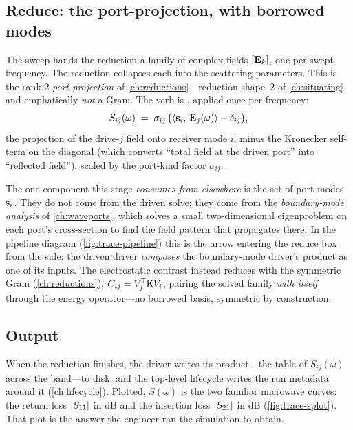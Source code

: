 \subsection{Reduce: the port-projection, with borrowed modes}
\label{sec:trace-reduce}

The sweep hands the reduction a family of complex fields $[\mathbf{E}_k]$, one per swept
frequency. The reduction collapses each into the scattering parameters. This is
the rank-2 \emph{port-projection} of \cref{ch:reductions}---reduction shape~2 of
\cref{ch:situating}, and emphatically \emph{not} a Gram. The verb is
, applied once per frequency:
\begin{equation}
  S_{ij}(\omega) \;=\; \sigma_{ij}\,\bigl(\left\langle \mathbf{s}_i,\, \mathbf{E}_j(\omega)\right\rangle - \delta_{ij}\bigr),
  \label{eq:trace-sparam}
\end{equation}
the projection of the drive-$j$ field onto receiver mode $i$, minus the Kronecker
self-term on the diagonal (which converts ``total field at the driven port'' into
``reflected field''), scaled by the port-kind factor $\sigma_{ij}$.

The one component this stage \emph{consumes from elsewhere} is the set of port
modes $\mathbf{s}_i$. They do not come from the driven solve; they come from the
\emph{boundary-mode analysis} of \cref{ch:waveports}, which solves a small
two-dimensional eigenproblem on each port's cross-section to find the field
pattern that propagates there. In the pipeline diagram
(\cref{fig:trace-pipeline}) this is the arrow entering the reduce box from the
side: the driven driver \emph{composes} the boundary-mode driver's product as one
of its inputs. The electrostatic contrast instead reduces with the symmetric Gram
 (\cref{ch:reductions}), $C_{ij}=V_j^{\!\top}\mathsf{K} V_i$, pairing
the solved family \emph{with itself} through the energy operator---no borrowed
basis, symmetric by construction.

\subsection{Output}

When the reduction finishes, the driver writes its product---the table of
$S_{ij}(\omega)$ across the band---to disk, and the top-level lifecycle writes the
run metadata around it (\cref{ch:lifecycle}). Plotted, $S(\omega)$ is the two
familiar microwave curves: the return loss $\lvert S_{11}\rvert$ in dB and the insertion
loss $\lvert S_{21}\rvert$ in dB (\cref{fig:trace-splot}). That plot is the answer the
engineer ran the simulation to obtain.

